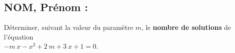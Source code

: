 \documentclass[a4paper,11pt,exos]{nsi} %
\begin{document}


\subsection*{NOM, Prénom : \dotfill} 

\maketitle


\begin{exercice}
    Déterminer, suivant la valeur du paramètre $m$, le \textbf{nombre de solutions} de l'équation\\ $-m~x-x^{2}+2~m+3~x+1=0$.
\end{exercice}

\end{document}
